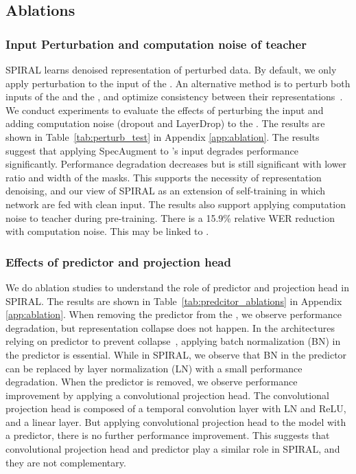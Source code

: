 \subsection{Ablations}
\label{sec:Ablations}

\subsubsection{Input Perturbation and computation noise of teacher}

SPIRAL learns denoised representation of perturbed data. 
By default, we only apply perturbation to the input of the \student{}. 
An alternative method is to perturb both inputs of the \teacher{} and the \student{}, and optimize consistency between their representations~\citep{Grill2020, chen2021exploring}.
We conduct experiments to evaluate the effects of perturbing the input and adding computation noise (dropout and LayerDrop) to the \teacher{}.
The results are shown in Table~\ref{tab:perturb_test} in Appendix \ref{app:ablation}. The results suggest that applying SpecAugment to \teacher{}'s input degrades performance significantly.
Performance degradation decreases but is still significant with lower ratio and width of the masks.
This supports the necessity of representation denoising, and our view of SPIRAL as an extension of self-training in which \teacher{} network are fed with clean input. 
The results also support applying computation noise to teacher during pre-training. There is a 15.9\% relative WER reduction with computation noise. This may be linked to \citet{dropbayes}.

\subsubsection{Effects of predictor and projection head}

We do ablation studies to understand the role of predictor and projection head in SPIRAL.
The results are shown in Table~\ref{tab:predcitor_ablations} in Appendix \ref{app:ablation}.
When removing the predictor from the \student{}, we observe performance degradation, but representation collapse does not happen.
In the architectures relying on predictor to prevent collapse~\citep{Grill2020, chen2021exploring},
applying batch normalization (BN) in the predictor is essential. While in SPIRAL, we observe that BN in the predictor can be replaced by layer normalization (LN) with a small performance degradation.
When the predictor is removed, we observe performance improvement by applying a convolutional projection head.
The convolutional projection head is composed of a temporal convolution layer with LN and ReLU, and a linear layer. 
But applying convolutional projection head to the model with a predictor, there is no further performance improvement. This suggests that convolutional projection head and predictor play a similar role in SPIRAL, and they are not complementary.


